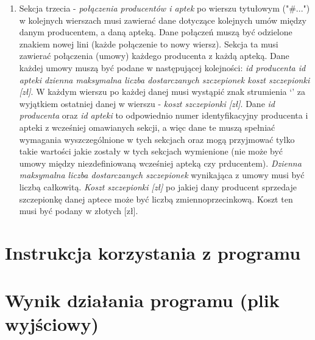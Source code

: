\documentclass{article}
\begin{document}
\begin{enumerate}
    \item Sekcja trzecia - \emph{połączenia producentów i aptek} po wierszu tytułowym ("\#...") w kolejnych wierszach musi zawierać dane dotyczące kolejnych umów między danym producentem, a daną apteką. Dane połączeń muszą być odzielone znakiem nowej lini (każde połączenie to nowy wiersz). Sekcja ta musi zawierać połączenia (umowy) każdego producenta z każdą apteką. Dane każdej umowy muszą być podane w następującej kolejności: \emph{id producenta \textbar\space id apteki \textbar\space dzienna maksymalna liczba dostarczanych szczepionek \textbar\space koszt szczepionki [zł]}. W każdym wierszu po każdej danej musi wystąpić znak strumienia ‘\textbar’ za wyjątkiem ostatniej danej w wierszu - \emph{koszt szczepionki [zł]}.  Dane \emph{id producenta} oraz \emph{id apteki} to odpowiednio numer identyfikacyjny producenta i apteki z wcześniej omawianych sekcji, a więc dane te muszą spełniać wymagania wyszczególnione w tych sekcjach oraz mogą przyjmować tylko takie wartości jakie zostały w tych sekcjach wymienione (nie może być umowy między niezdefiniowaną wcześniej apteką czy prducentem). \emph{Dzienna maksymalna liczba dostarczanych szczepionek} wynikająca z umowy musi być liczbą całkowitą. \emph{Koszt szczepionki [zł]} po jakiej dany producent sprzedaje szczepionkę danej aptece może być liczbą zmiennoprzecinkową. Koszt ten musi być podany w złotych [zł].
\end{enumerate}
\section{Instrukcja korzystania z programu}
\section{Wynik działania programu (plik wyjściowy)}
\end{document}
